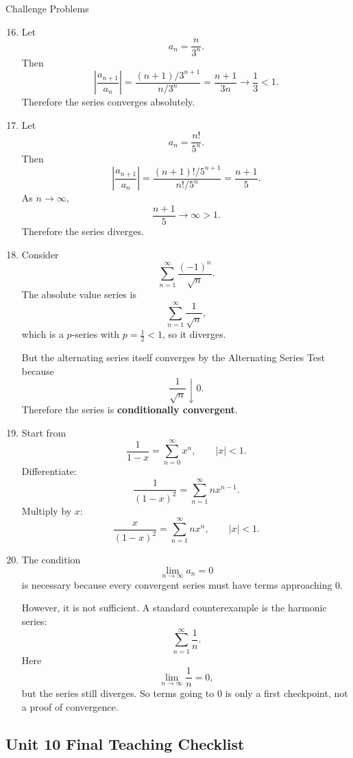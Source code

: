 \documentclass[11pt]{article}
\begin{document}
\begin{theorybox}{Challenge Problems}
\begin{enumerate}
\setcounter{enumi}{15}
    \item
    Let
    \[
    a_n=\frac{n}{3^n}.
    \]
    Then
    \[
    \left|\frac{a_{n+1}}{a_n}\right|
    =
    \frac{(n+1)/3^{n+1}}{n/3^n}
    =
    \frac{n+1}{3n}\to \frac13<1.
    \]
    Therefore the series converges absolutely.

    \item
    Let
    \[
    a_n=\frac{n!}{5^n}.
    \]
    Then
    \[
    \left|\frac{a_{n+1}}{a_n}\right|
    =
    \frac{(n+1)!/5^{n+1}}{n!/5^n}
    =
    \frac{n+1}{5}.
    \]
    As \(n\to\infty\),
    \[
    \frac{n+1}{5}\to\infty>1.
    \]
    Therefore the series diverges.

    \item
    Consider
    \[
    \sum_{n=1}^{\infty}\frac{(-1)^n}{\sqrt n}.
    \]
    The absolute value series is
    \[
    \sum_{n=1}^{\infty}\frac{1}{\sqrt n},
    \]
    which is a \(p\)-series with \(p=\frac12<1\), so it diverges.

    But the alternating series itself converges by the Alternating Series Test because
    \[
    \frac{1}{\sqrt n}\downarrow 0.
    \]
    Therefore the series is \textbf{conditionally convergent}.

    \item
    Start from
    \[
    \frac{1}{1-x}=\sum_{n=0}^{\infty}x^n,\qquad |x|<1.
    \]
    Differentiate:
    \[
    \frac{1}{(1-x)^2}
    =
    \sum_{n=1}^{\infty}n x^{n-1}.
    \]
    Multiply by \(x\):
    \[
    \frac{x}{(1-x)^2}
    =
    \sum_{n=1}^{\infty}n x^n,
    \qquad |x|<1.
    \]

    \item
    The condition
    \[
    \lim_{n\to\infty}a_n=0
    \]
    is necessary because every convergent series must have terms approaching \(0\).

    However, it is not sufficient. A standard counterexample is the harmonic series:
    \[
    \sum_{n=1}^{\infty}\frac1n.
    \]
    Here
    \[
    \lim_{n\to\infty}\frac1n=0,
    \]
    but the series still diverges. So terms going to \(0\) is only a first checkpoint, not a proof of convergence.
\end{enumerate}
\end{theorybox}


\newpage
\subsection{Unit 10 Final Teaching Checklist}
\end{document}
